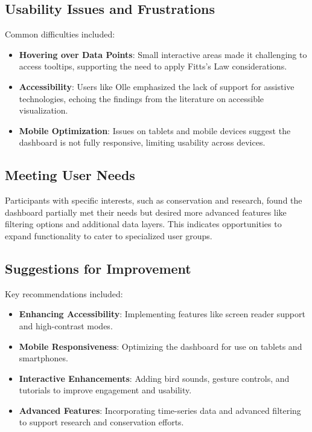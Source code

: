 \subsection{Usability Issues and Frustrations}

Common difficulties included:

\begin{itemize}
    \item \textbf{Hovering over Data Points}: Small interactive areas made it challenging to access tooltips, supporting the need to apply Fitts's Law considerations.
    \item \textbf{Accessibility}: Users like Olle emphasized the lack of support for assistive technologies, echoing the findings from the literature on accessible visualization.
    \item \textbf{Mobile Optimization}: Issues on tablets and mobile devices suggest the dashboard is not fully responsive, limiting usability across devices.
\end{itemize}

\subsection{Meeting User Needs}

Participants with specific interests, such as conservation and research, found the dashboard partially met their needs but desired more advanced features like filtering options and additional data layers. This indicates opportunities to expand functionality to cater to specialized user groups.

\subsection{Suggestions for Improvement}

Key recommendations included:

\begin{itemize}
    \item \textbf{Enhancing Accessibility}: Implementing features like screen reader support and high-contrast modes.
    \item \textbf{Mobile Responsiveness}: Optimizing the dashboard for use on tablets and smartphones.
    \item \textbf{Interactive Enhancements}: Adding bird sounds, gesture controls, and tutorials to improve engagement and usability.
    \item \textbf{Advanced Features}: Incorporating time-series data and advanced filtering to support research and conservation efforts.
\end{itemize}